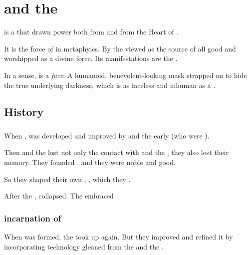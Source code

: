 \section{\Iquin and the \Sephiroth}
\Iquin{} is a  that drawn power both from \Erebos{} and from the Heart of \Miith{}. 

It is the force of  in  metaphyics. By the  viewed as the source of all good and worshipped as a divine force. Its manifestations are the . 

In a sense, \iquin{} is a \emph{face}: 
A humanoid, benevolent-looking mask strapped on to hide the true underlying darkness, which is as faceless and inhuman as a \bane. 








\subsection{History}
\subsubsection{\Esheram}
When , \itzach{} was developed and improved by  and the early \resphain{} (who were ). 

Then  and the \resphain{} lost not only the contact with \Semiza{} and the \banelords, they also lost their memory. 
They founded , and they were noble and good. 

So they shaped their own \dweomer, , which they . 

After the , \Esheram collapsed.
The \resphain embraced \itzach. 





\subsubsection{\Kezeradi{} incarnation of \iquin}
When \Kezerad{} was formed, the \Kezeradi{} took up \iquin{} again. 
But they improved and refined it by incorporating technology gleaned from the \ophidians{} and the . 

